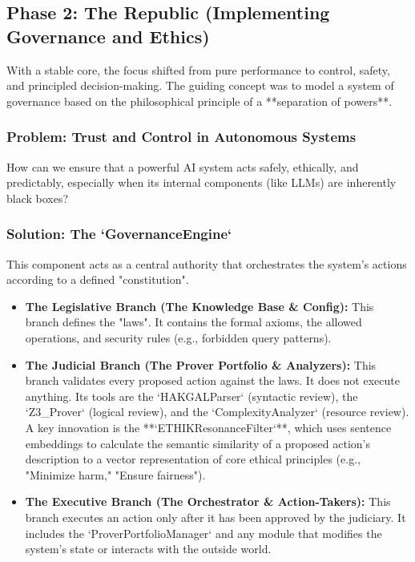 \documentclass[11pt, a4paper]{article}
\begin{document}
\subsection{Phase 2: The Republic (Implementing Governance and Ethics)}
\label{subsec:republic}

With a stable core, the focus shifted from pure performance to control, safety, and principled decision-making. The guiding concept was to model a system of governance based on the philosophical principle of a **separation of powers**.

\subsubsection{Problem: Trust and Control in Autonomous Systems}
How can we ensure that a powerful AI system acts safely, ethically, and predictably, especially when its internal components (like LLMs) are inherently black boxes?

\subsubsection{Solution: The `GovernanceEngine`}
This component acts as a central authority that orchestrates the system's actions according to a defined "constitution".

\begin{itemize}
    \item \textbf{The Legislative Branch (The Knowledge Base \& Config):} This branch defines the "laws". It contains the formal axioms, the allowed operations, and security rules (e.g., forbidden query patterns).
    \item \textbf{The Judicial Branch (The Prover Portfolio \& Analyzers):} This branch validates every proposed action against the laws. It does not execute anything. Its tools are the `HAKGALParser` (syntactic review), the `Z3_Prover` (logical review), and the `ComplexityAnalyzer` (resource review). A key innovation is the **`ETHIKResonanceFilter`**, which uses sentence embeddings to calculate the semantic similarity of a proposed action's description to a vector representation of core ethical principles (e.g., "Minimize harm," "Ensure fairness").
    \item \textbf{The Executive Branch (The Orchestrator \& Action-Takers):} This branch executes an action only after it has been approved by the judiciary. It includes the `ProverPortfolioManager` and any module that modifies the system's state or interacts with the outside world.
\end{itemize}
\end{document}

